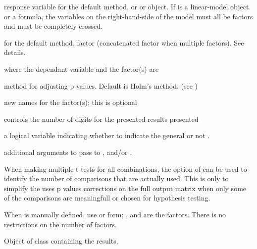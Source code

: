 \documentclass[a4paper]{book}
\begin{document}
%
\begin{Arguments}
\begin{ldescription}
\item[\code{y}] response variable for the default method, or  or
 object. If  is a linear-model object or a formula,
the variables on the right-hand-side of the model must all be factors and
must be completely crossed.
\item[\code{group}] for the default method, factor (concatenated factor when multiple factors). See details.
\item[\code{data}]  where the dependant variable and the factor(s) are
\item[\code{p.adjust.method}] method for adjusting p values. Default is Holm's method. (see ) 
\item[\code{column}] new names for the factor(s); this is optional 
\item[\code{digits}] controls the number of digits for the presented results presented
\item[\code{silent }] a logical variable indicating whether to indicate the general   or not .
\item[\code{...}] additional arguments to pass to ,  and/or . 
\end{ldescription}
\end{Arguments}
%
\begin{Details}\relax
When making multiple t tests for all combinations, the  option of
 can be used to identify the number of comparisons that are actually used.
This is only to simplify the uses p values corrections on the full output
matrix when only some of the comparisons are meaningfull or chosen for hypothesis testing.


When  is manually defined, use  or
form; ,  and  are the factors. There is no restrictions on the number of factors.


\end{Details}
%
\begin{Value}
Object of class  containing the results.

\end{Value}
\end{document}
